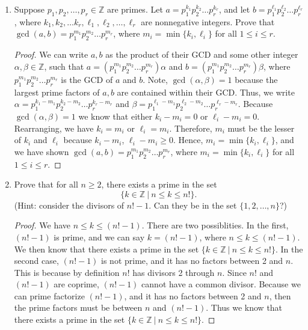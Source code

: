 \documentclass[12pt]{article}
\DeclareMathOperator{\Gcd}{gcd}
\renewcommand{\gcd}[2]{\Gcd\left(#1, #2\right)}
\newcommand{\Z}{\mathbb{Z}}
\begin{document}
\begin{enumerate}
\item Suppose $p_1, p_2, \dots, p_r\in \Z$ are primes. Let $a=p_1^{k_1}p_2^{k_2}\dots p_r^{k_r}$, and let $b=p_1^{\ell_1}p_2^{\ell_2}\dots p_r^{\ell_r}$, where $k_1, k_2, \dots k_r, \ell_1, \ell_2, \dots, \ell_r$ are nonnegative integers. Prove that $\gcd{a}{b} = p_1^{m_1}p_2^{m_2}\dots p_r^{m_r}$, where $m_i = \min\{k_i, \ell_i\}$ for all $1\leq i\leq r$.

\begin{proof}

We can write $a,b$ as the product of their GCD and some other integer $\alpha, \beta \in \Z$, such that $a = (p_1^{m_1}p_2^{m_2}\dots p_r^{m_r})\alpha$ and $b = (p_1^{m_1}p_2^{m_2}\dots p_r^{m_r})\beta$, where $p_1^{m_1}p_2^{m_2}\dots p_r^{m_r}$ is the GCD of $a$ and $b$. Note, $\gcd{\alpha}{\beta} = 1$ because the largest prime factors of $a, b$ are contained within their GCD. Thus, we write $\alpha = p_1^{k_1 - m_1}p_2^{k_2 - m_2}\dots p_r^{k_r - m_r}$ and $\beta = p_1^{\ell_1 - m_1}p_2^{\ell_2 - m_2}\dots p_r^{\ell_r - m_r}$. Because $\gcd{\alpha}{\beta} = 1$ we know that either $k_i - m_i = 0$ or $\ell_i - m_i = 0$. Rearranging, we have $k_i = m_i$ or $\ell_i = m_i$. Therefore, $m_i$ must be the lesser of $k_i$ and $\ell_i$ because $k_i - m_i$, $\ell_i - m_i \geq 0$. Hence, $m_i = \min\{k_i, \ell_i\}$, and we have shown $\gcd{a}{b} = p_1^{m_1}p_2^{m_2}\dots p_r^{m_r}$, where $m_i = \min\{k_i, \ell_i\}$ for all $1\leq i\leq r$. 

\end{proof}

\item Prove that for all $n\geq 2$, there exists a prime in the set \[\{k\in \Z\ | \ n\leq k \leq n!\}.\] (Hint: consider the divisors of $n!-1$. Can they be in the set $\{1, 2, \dots, n\}$?)

\begin{proof}
We have $n \leq k \leq (n! - 1)$. There are two possiblities. In the first, $(n! - 1)$ is prime, and we can say $k = (n! - 1)$, where $n \leq k \leq (n! - 1)$. We then know that there exists a prime in the set $\{k\in \Z\ | \ n\leq k \leq n!\}.$ In the second case, $(n! - 1)$ is not prime, and it has no factors between 2 and $n$. This is because by definition $n!$ has divisors 2 through $n$. Since $n!$ and $(n! - 1)$ are coprime, $(n!-1)$ cannot have a common divisor. Because we can prime factorize $(n! - 1)$, and it has no factors between 2 and $n$, then the prime factors must be between $n$ and $(n! - 1)$. Thus we know that there exists a prime in the set $\{k\in \Z\ | \ n\leq k \leq n!\}.$
\end{proof}

\end{enumerate}
\end{document}
